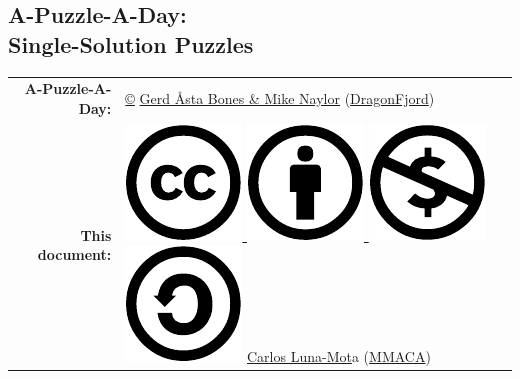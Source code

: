 \documentclass[a4paper, 10pt]{article}
\begin{document}
    \begin{center}
        
        \section*{\Huge A-Puzzle-A-Day:\\Single-Solution Puzzles}
        \bigskip
        
        {\large \begin{tabular}{rl}
         \textbf{A-Puzzle-A-Day:} & \href{https://en.wikipedia.org/wiki/All_rights_reserved}{©} %
            \href{https://www.dragonfjord.com/about-us/}{Gerd Åsta Bones \& Mike Naylor} (\href{https://www.dragonfjord.com/}{DragonFjord}) \\[1ex]
        \textbf{This document:} & \href{https://creativecommons.org/licenses/by-nc-sa/4.0/}{%
            \includegraphics[scale=0.16]{cc.pdf}%
            \includegraphics[scale=0.16]{by.pdf}%
            \includegraphics[scale=0.16]{nc.pdf}%
            \includegraphics[scale=0.16]{sa.pdf}} %
            \href{https://github.com/CarlosLunaMota}{Carlos Luna-Mot}a (\href{https://mmaca.cat/}{MMACA})
        \end{tabular}}


\end{center}
\end{document}
